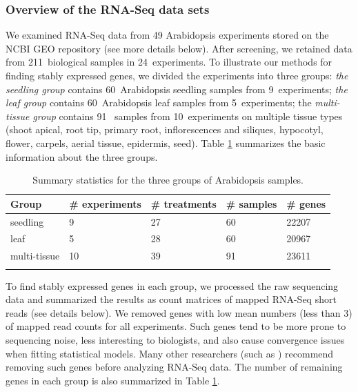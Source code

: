 \documentclass[letterpaper,12pt]{article}
\newcommand{\howmanySamples}{211~}
\newcommand{\howmanylab}{24~}
\newcommand{\howmanyseedlingsample}{60~}
\newcommand{\howmanyleafsample}{60~}
\newcommand{\howmanytissuesample}{91~}
\newcommand{\howmanyseedlingexperiment}{9~}
\newcommand{\howmanyleafexperiment}{5~}
\newcommand{\howmanytissueexperiment}{10~}
\begin{document}
\subsubsection*{Overview of the RNA-Seq data sets}
We examined RNA-Seq data from 49 Arabidopsis experiments stored on the NCBI
GEO repository (see more details below). After screening, we retained data
from \howmanySamples biological samples in \howmanylab experiments.  To illustrate our methods
for finding stably expressed genes, we divided the experiments into three
groups: \textit{the seedling group} contains \howmanyseedlingsample Arabidopsis seedling samples
from \howmanyseedlingexperiment experiments; \textit{ the leaf group} contains \howmanyleafsample Arabidopsis leaf
samples from \howmanyleafexperiment experiments;  the \textit{multi-tissue group} contains \howmanytissuesample
samples from \howmanytissueexperiment experiments on multiple tissue types (shoot apical, root tip,
primary root, inflorescences and siliques, hypocotyl, flower, carpels, aerial
tissue, epidermis, seed).  Table \ref{table:TableSet3} summarizes the basic information about
the three groups.
\begin{table}[!ht]
    \centering
    \caption{Summary statistics for the three groups of Arabidopsis samples.}
    \begin{tabular}{lp{2.4cm}p{2.3cm}p{2cm}p{1.5cm}} \hline
	Group & \#  experiments & \# treatments  & \# samples & \# genes \\ \hline
	seedling &   9 &  27 &  60 & 22207 \\ 
	leaf &   5 &  28 &  60 & 20967 \\ 
	multi-tissue &  10 &  39 &  91 & 23611 \\ \hline
	\label{table:TableSet3}
    \end{tabular}
\end{table}

To find stably expressed genes in each group, we processed the raw
sequencing data and summarized the results as count matrices of mapped RNA-Seq
short reads (see details below).  We removed genes with low mean numbers (less
than 3) of mapped read counts for all experiments.  Such genes tend to be more prone to sequencing
noise, less interesting to biologists, and also cause convergence issues when
fitting statistical models. Many other researchers (such as \citealt{anders2013count})
recommend removing such genes before analyzing RNA-Seq data.  The number of
remaining genes in each group is also summarized in Table
\ref{table:TableSet3}.
\end{document}
